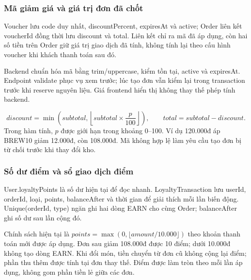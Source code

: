 \subsubsection{Mã giảm giá và giá trị đơn đã chốt}
Voucher lưu code duy nhất, discountPercent, expiresAt và active; Order liên kết voucherId đồng thời lưu discount và total. Liên kết chỉ ra mã đã áp dụng, còn hai số tiền trên Order giữ giá trị giao dịch đã tính, không tính lại theo cấu hình voucher khi khách thanh toán sau đó.

Backend chuẩn hóa mã bằng trim/uppercase, kiểm tồn tại, active và expiresAt. Endpoint validate phục vụ xem trước; lúc tạo đơn vẫn kiểm lại trong transaction trước khi reserve nguyên liệu. Giá frontend hiển thị không thay thế phép tính backend.

\[
 discount=\min\left(subtotal,\left\lfloor subtotal\times\frac{p}{100}\right\rfloor\right),
 \qquad total=subtotal-discount.
\]
Trong hàm tính, $p$ được giới hạn trong khoảng 0--100. Ví dụ 120.000đ áp BREW10 giảm 12.000đ, còn 108.000đ. Mã không hợp lệ làm yêu cầu tạo đơn bị từ chối trước khi thay đổi kho.

\subsubsection{Số dư điểm và sổ giao dịch điểm}
User.loyaltyPoints là số dư hiện tại để đọc nhanh. LoyaltyTransaction lưu userId, orderId, loại, points, balanceAfter và thời gian để giải thích mỗi lần biến động. Unique(orderId, type) ngăn ghi hai dòng EARN cho cùng Order; balanceAfter ghi số dư sau lần cộng đó.

Chính sách hiện tại là $points=\max(0,\lfloor amount/10.000\rfloor)$ theo khoản thanh toán mới được áp dụng. Đơn sau giảm 108.000đ được 10 điểm; dưới 10.000đ không tạo dòng EARN. Khi đổi món, tiền chuyển từ đơn cũ không cộng lại điểm; phần thu thêm được tính tại đơn thay thế. Điểm được làm tròn theo mỗi lần áp dụng, không gom phần tiền lẻ giữa các đơn.
